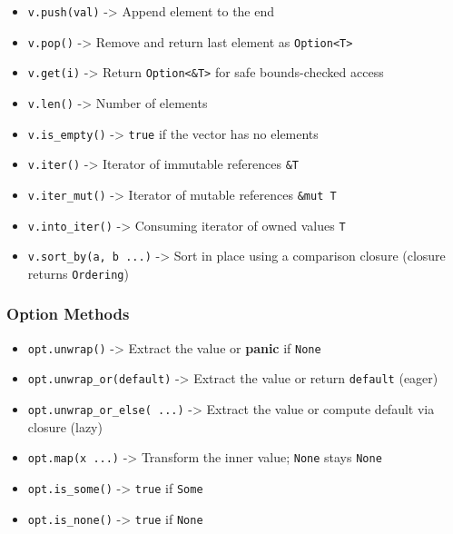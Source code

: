\documentclass[
  11pt,
]{article}
\providecommand{\tightlist}{%
  \setlength{\itemsep}{0pt}\setlength{\parskip}{0pt}}
\begin{document}
\begin{itemize}
\tightlist
\item
  \texttt{v.push(val)} -\textgreater{} Append element to the end
\item
  \texttt{v.pop()} -\textgreater{} Remove and return last element as
  \texttt{Option\textless{}T\textgreater{}}
\item
  \texttt{v.get(i)} -\textgreater{} Return
  \texttt{Option\textless{}\&T\textgreater{}} for safe bounds-checked
  access
\item
  \texttt{v.len()} -\textgreater{} Number of elements
\item
  \texttt{v.is\_empty()} -\textgreater{} \texttt{true} if the vector has
  no elements
\item
  \texttt{v.iter()} -\textgreater{} Iterator of immutable references
  \texttt{\&T}
\item
  \texttt{v.iter\_mut()} -\textgreater{} Iterator of mutable references
  \texttt{\&mut\ T}
\item
  \texttt{v.into\_iter()} -\textgreater{} Consuming iterator of owned
  values \texttt{T}
\item
  \texttt{v.sort\_by(\textbar{}a,\ b\textbar{}\ ...)} -\textgreater{}
  Sort in place using a comparison closure (closure returns
  \texttt{Ordering})
\end{itemize}

\subsubsection{Option Methods}\label{option-methods}

\begin{itemize}
\tightlist
\item
  \texttt{opt.unwrap()} -\textgreater{} Extract the value or
  \textbf{panic} if \texttt{None}
\item
  \texttt{opt.unwrap\_or(default)} -\textgreater{} Extract the value or
  return \texttt{default} (eager)
\item
  \texttt{opt.unwrap\_or\_else(\textbar{}\textbar{}\ ...)}
  -\textgreater{} Extract the value or compute default via closure
  (lazy)
\item
  \texttt{opt.map(\textbar{}x\textbar{}\ ...)} -\textgreater{} Transform
  the inner value; \texttt{None} stays \texttt{None}
\item
  \texttt{opt.is\_some()} -\textgreater{} \texttt{true} if \texttt{Some}
\item
  \texttt{opt.is\_none()} -\textgreater{} \texttt{true} if \texttt{None}
\end{itemize}
\end{document}
